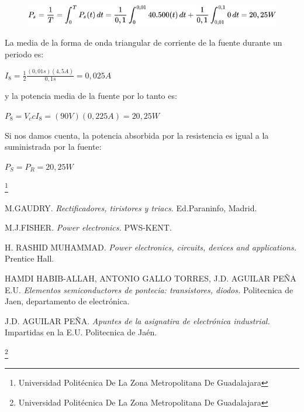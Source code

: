 \documentclass[11pt,a4paper]{article}
\begin{document}
\begin{figure}[hbtp]
\centering
\includegraphics[scale=0.60]{6.png}
\end{figure}

La media de la forma de onda triangular de corriente de la fuente durante un periodo es: 

\begin{Huge}
$ I_8 = \frac{1}{2} \frac{(0,01s)(4,5A)}{0,1s} =  0,025A $
\end{Huge}

y la potencia media de la fuente por lo tanto es: 

\begin{Huge}
$ P_8 = V_ccI_8 = (90V)(0,225A) = 20,25W $
\end{Huge}

Si nos damos cuenta, la potencia absorbida por la resistencia es igual a la suministrada por la fuente: 

\begin{Huge}
$ P_S = P_R = 20,25W $
\end{Huge}

\footnote{Universidad Politécnica De La Zona Metropolitana De Guadalajara} 

\newpage



\begin{thebibliography}{X}

 \textsc{M.GAUDRY.} \textit{Rectificadores, tiristores y triacs.} Ed.Paraninfo, Madrid.

 \textsc{M.J.FISHER.} \textit{Power electronics.} 
PWS-KENT.


 \textsc{H. RASHID MUHAMMAD.} \textit{Power electronics, circuits, devices and applications.} Prentice Hall.

 \textsc{HAMDI HABIB-ALLAH, ANTONIO GALLO TORRES, J.D. AGUILAR PEÑA E.U.} \textit{Elementos semiconductores de pontecia: transistores, diodos.} Politecnica de Jaen, departamento de electrónica.

 \textsc{J.D. AGUILAR PEÑA.} \textit{Apuntes de la asignatira de electrónica industrial.} Impartidas en la E.U. Politecnica de Jaén.


\end{thebibliography}



\footnote{Universidad Politécnica De La Zona Metropolitana De Guadalajara} 
\end{document}
